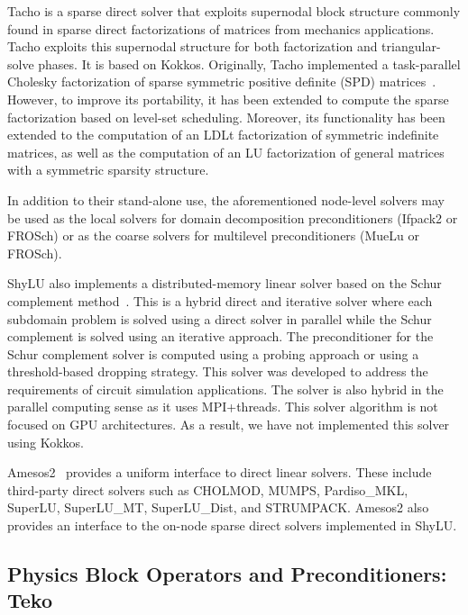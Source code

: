 Tacho is a sparse direct solver that exploits supernodal block structure commonly found in sparse direct factorizations of matrices from mechanics applications. Tacho exploits this supernodal structure for both factorization and triangular-solve phases. It is based on Kokkos. Originally, Tacho implemented a task-parallel Cholesky factorization of sparse symmetric positive definite (SPD) matrices~\cite{Tacho2018}. However, to improve its portability, it has been extended to compute the sparse factorization based on level-set scheduling. Moreover, its functionality has been extended to the computation of an LDLt factorization of symmetric indefinite matrices, as well as the computation of an LU factorization of general matrices with a symmetric sparsity structure.

In addition to their stand-alone use, the aforementioned node-level solvers may be used as the local solvers for domain decomposition preconditioners (Ifpack2 or FROSch) or as the coarse solvers for multilevel preconditioners (MueLu or FROSch).

ShyLU also implements a distributed-memory linear solver based on the Schur complement method~\cite{ShyLUCore2014}. This is a hybrid direct and iterative solver where each subdomain problem is solved using a direct solver in parallel while the Schur complement is solved using an iterative approach. The preconditioner for the Schur complement solver is computed using a probing approach or using a threshold-based dropping strategy. This solver was developed to address the requirements of circuit simulation applications. The solver is also hybrid in the parallel computing sense as it uses MPI+threads. This  solver algorithm is not focused on GPU architectures. As a result, we have not implemented this solver using Kokkos. %

Amesos2~\cite{Bavier2012a} provides a uniform interface to direct linear solvers.
These include third-party direct solvers such as CHOLMOD, MUMPS, Pardiso\_MKL, SuperLU, SuperLU\_MT, SuperLU\_Dist, and STRUMPACK.
Amesos2 also provides an interface to the on-node sparse direct solvers implemented in ShyLU.



\subsection{Physics Block Operators and Preconditioners: Teko}
\label{sec:teko}

